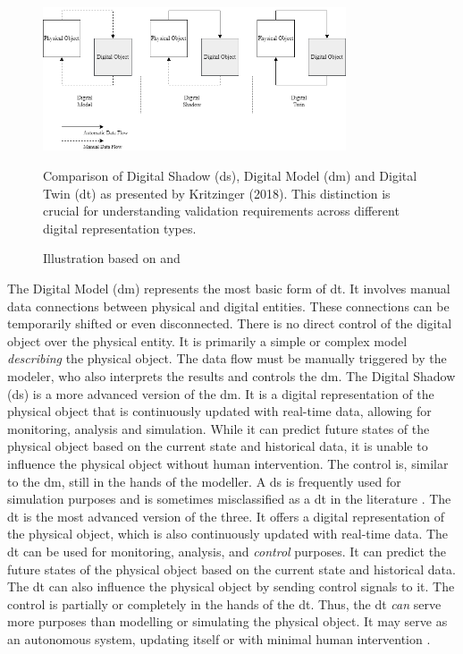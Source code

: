 \begin{figure}[htbp]
  \centering
  \includegraphics[width=0.8\textwidth]{figures/kritzinger.png}
  \caption[The different Types of Digital Models.]{Comparison of Digital Shadow (\gls{ds}), Digital Model (\gls{dm}) and Digital Twin (\gls{dt}) as presented by Kritzinger (2018). This distinction is crucial for understanding validation requirements across different digital representation types.}
  \label{fig:Kritzinger}
  \caption*{Illustration based on \textcite{kritzinger2018digital} and \textcite{Zhang2021jmsy}}
\end{figure}

The Digital Model (\gls{dm}) represents the most basic form of \gls{dt}. It involves manual data connections between physical and digital entities. These connections can be temporarily shifted or even disconnected. There is no direct control of the digital object over the physical entity. It is primarily a simple or complex model \textit{describing} the physical object. The data flow must be manually triggered by the modeler, who also interprets the results and controls the \gls{dm}.
The Digital Shadow (\gls{ds}) is a more advanced version of the \gls{dm}. It is a digital representation of the physical object that is continuously updated with real-time data, allowing for monitoring, analysis and simulation. While it can predict future states of the physical object based on the current state and historical data, it is unable to influence the physical object without human intervention. The control is, similar to the \gls{dm}, still in the hands of the modeller. A \gls{ds} is frequently used for simulation purposes and is sometimes misclassified as a \gls{dt} in the literature \autocite{kritzinger2018digital,sepasgozar2021differentiating}.
The \gls{dt} is the most advanced version of the three. It offers a digital representation of the physical object, which is also continuously updated with real-time data. The \gls{dt} can be used for monitoring, analysis, and \textit{control} purposes. It can predict the future states of the physical object based on the current state and historical data. The \gls{dt} can also influence the physical object by sending control signals to it. The control is partially or completely in the hands of the \gls{dt}. Thus, the \gls{dt} \textit{can} serve more purposes than modelling or simulating the physical object. It may serve as an autonomous system, updating itself or with minimal human intervention \autocite{kritzinger2018digital}.


